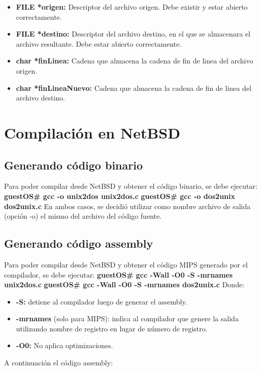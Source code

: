 \documentclass[a4paper,10pt]{article}
\begin{document}
  \begin{itemize}
  \item {\bf FILE *origen:}
    Descriptor del archivo origen. Debe existir y estar abierto correctamente.
  \item {\bf FILE *destino:}
    Descriptor del archivo destino, en el que se almacenara el archivo resultante. Debe estar abierto correctamente.
  \item {\bf char *finLinea:}
    Cadena que almacena la cadena de fin de linea del archivo origen.
  \item {\bf char *finLineaNuevo:}
    Cadena que almacena la cadena de fin de linea del archivo destino.
  \end{itemize}

\section{Compilaci\'on en NetBSD}
  \subsection{Generando c\'odigo binario}
    Para poder compilar desde NetBSD y obtener el c\'odigo binario, se debe ejecutar:
    \newline
    {\bf guestOS\# gcc -o unix2dos unix2dos.c} \newline
    {\bf guestOS\# gcc -o dos2unix dos2unix.c}
    \newline
    En ambos casos, se decidi\'o utilizar como nombre archivo de salida (opci\'on -o) el mismo del archivo 
    del c\'odigo fuente.
    
  \subsection{Generando c\'odigo assembly}
    Para poder compilar desde NetBSD y obtener el c\'odigo MIPS generado por el compilador, se debe ejecutar:
    \newline
    {\bf guestOS\# gcc -Wall -O0 -S -mrnames unix2dos.c} 
    \newline
    {\bf guestOS\# gcc -Wall -O0 -S -mrnames dos2unix.c}
    \newline
    Donde:
    \begin{itemize}
      \item {\bf-S:} detiene al compilador luego de generar el assembly.
      \item {\bf-mrnames} (solo para MIPS): indica al compilador que genere la salida utilizando nombre de 
	registro en lugar de n\'umero de registro.
      \item {\bf-O0:} No aplica optimizaciones.
    \end{itemize}
    A continuaci\'on el c\'odigo assembly:
\end{document}
